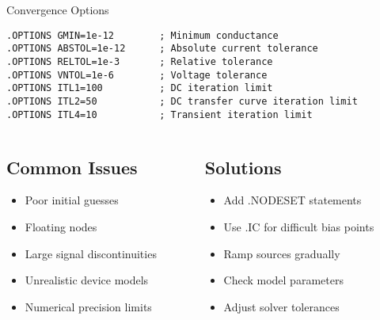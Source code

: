 \documentclass{beamer}
\begin{document}
\begin{frame}{Convergence Options}
    \begin{lstlisting}
.OPTIONS GMIN=1e-12        ; Minimum conductance
.OPTIONS ABSTOL=1e-12      ; Absolute current tolerance  
.OPTIONS RELTOL=1e-3       ; Relative tolerance
.OPTIONS VNTOL=1e-6        ; Voltage tolerance
.OPTIONS ITL1=100          ; DC iteration limit
.OPTIONS ITL2=50           ; DC transfer curve iteration limit
.OPTIONS ITL4=10           ; Transient iteration limit
    \end{lstlisting}
    
    \begin{columns}
        \begin{column}{0.5\textwidth}
            \subsection{Common Issues}
            \begin{itemize}
                \item Poor initial guesses
                \item Floating nodes
                \item Large signal discontinuities
                \item Unrealistic device models
                \item Numerical precision limits
            \end{itemize}
        \end{column}
        \begin{column}{0.5\textwidth}
            \subsection{Solutions}
            \begin{itemize}
                \item Add .NODESET statements
                \item Use .IC for difficult bias points
                \item Ramp sources gradually
                \item Check model parameters
                \item Adjust solver tolerances
            \end{itemize}
        \end{column}
    \end{columns}
\end{frame}
\end{document}
